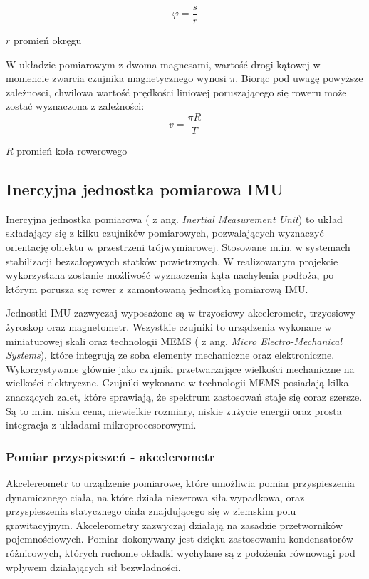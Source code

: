 \begin{equation}
    \varphi = \frac{s}{r}
\end{equation}

\begin{eqwhere}[2cm]
	\item[$r$] promień okręgu
\end{eqwhere}
W układzie pomiarowym z dwoma magnesami, wartość drogi kątowej w momencie zwarcia czujnika magnetycznego wynosi $\pi$. Biorąc pod uwagę powyższe zależnosci, chwilowa wartość prędkości liniowej poruszającego się roweru może zostać wyznaczona z zależności:
 \begin{equation}
    \label{eq:zaleznoscNaPredkosc}
    v = \frac{\pi R}{T}
\end{equation}
\begin{eqwhere}[2cm]
	\item[$R$] promień koła rowerowego
\end{eqwhere}
\subsection{Inercyjna jednostka pomiarowa IMU}
Inercyjna jednostka pomiarowa ( z ang. {\em Inertial Measurement Unit}) to układ składający się z kilku czujników pomiarowych, pozwalających wyznaczyć orientację obiektu w przestrzeni trójwymiarowej. Stosowane m.in. w systemach stabilizacji bezzałogowych statków powietrznych. W realizowanym projekcie wykorzystana zostanie możliwość wyznaczenia kąta nachylenia podłoża, po którym porusza się rower z zamontowaną jednostką pomiarową IMU.

Jednostki IMU zazwyczaj wyposażone są w trzyosiowy akcelerometr, trzyosiowy żyroskop oraz magnetometr. Wszystkie czujniki to urządzenia wykonane w miniaturowej skali oraz technologii MEMS ( z ang. {\em Micro Electro-Mechanical Systems}), które integrują ze soba elementy mechaniczne oraz elektroniczne. Wykorzystywane głównie jako czujniki przetwarzające wielkości mechaniczne na wielkości elektryczne. Czujniki wykonane w technologii MEMS posiadają kilka znaczących zalet, które sprawiają, że spektrum zastosowań staje się coraz szersze. Są to m.in. niska cena, niewielkie rozmiary, niskie zużycie energii oraz prosta integracja z układami mikroprocesorowymi. 

\subsubsection{Pomiar przyspieszeń - akcelerometr}
Akcelereometr to urządzenie pomiarowe, które umożliwia pomiar przyspieszenia dynamicznego ciała, na które działa niezerowa siła wypadkowa, oraz przyspieszenia statycznego ciała znajdującego się w ziemskim polu grawitacyjnym. Akcelerometry zazwyczaj działają na zasadzie przetworników pojemnościowych. Pomiar dokonywany jest dzięku zastosowaniu kondensatorów różnicowych, których ruchome okładki wychylane są z położenia równowagi pod wpływem działających sił bezwładności.

